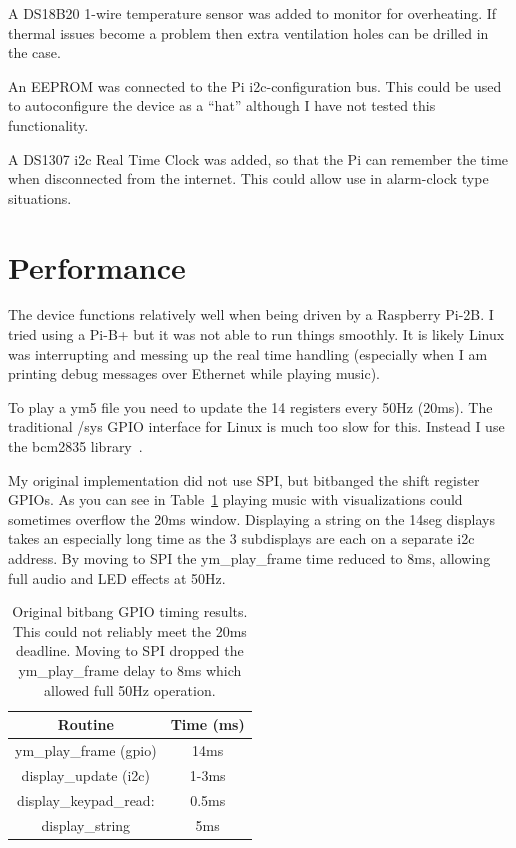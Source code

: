 \documentclass[11pt]{article}
\begin{document}
A DS18B20 1-wire temperature sensor was added to monitor for overheating.
If thermal issues become a problem then
extra ventilation holes can be drilled in the case.

An EEPROM was connected to the Pi i2c-configuration bus.
This could be used to autoconfigure the device as a ``hat'' although
I have not tested this functionality.

A DS1307 i2c Real Time Clock was added, so that the Pi can remember
the time when disconnected from the internet.
This could allow use in alarm-clock type situations.


\section{Performance}

The device functions relatively well when being driven by a 
Raspberry Pi-2B.
I tried using a Pi-B+ but it was not able to run things smoothly.
It is likely Linux was interrupting and messing up the real time handling
(especially when I am printing debug messages over Ethernet while playing
music).

To play a ym5 file you need to update the 14 registers every 50Hz
(20ms).
The traditional /sys GPIO interface for Linux is much too slow for this.
Instead I use the bcm2835 library~\cite{bcm2835}.

My original implementation did not use SPI, but bitbanged the 
shift register GPIOs.
As you can see in Table~\ref{table:timings} playing music with
visualizations could sometimes overflow the 20ms window.
Displaying a string on the 14seg displays takes an especially long time
as the 3 subdisplays are each on a separate i2c address.
By moving to SPI the ym\_play\_frame time reduced to 8ms, allowing
full audio and LED effects at 50Hz.

\begin{table}[tbh]
\caption{Original bitbang GPIO timing results.
This could not reliably meet the 20ms deadline.
Moving to SPI dropped the ym\_play\_frame delay to 8ms
which allowed full 50Hz operation.
\label{table:timings}}
\centering
\begin{tabular}{|c|c|}
\hline
Routine	& Time (ms) \\
\hline
\hline
ym\_play\_frame (gpio) & 14ms \\
\hline
display\_update (i2c) & 1-3ms \\
\hline
display\_keypad\_read: & 0.5ms \\
\hline
display\_string       & 5ms \\
\hline
\end{tabular}
\end{table}
\end{document}
